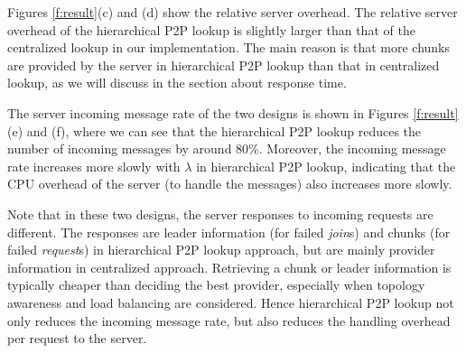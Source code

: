     Figures \ref{f:result}(c) and (d) show the relative server
    overhead.
    The relative server overhead of the hierarchical P2P lookup is
    slightly larger than that of the centralized lookup in our
    implementation. The main reason is that more chunks are provided
    by the server in hierarchical P2P lookup than that in centralized
    lookup, as we will discuss in the section about response time.%

    The server incoming message rate of the two designs is shown in
    Figures \ref{f:result}(e) and (f), where we can see that 
    the hierarchical P2P lookup reduces the number of incoming
    messages by around
    80\%. Moreover, the incoming message rate increases more slowly with
    $\lambda$ in hierarchical P2P lookup, indicating that 
    the CPU overhead of the server (to handle the messages) also 
	increases more slowly.

    Note that in these two designs, the server responses to incoming
    requests are different. The responses are leader
    information (for failed \emph{join}s) and chunks (for failed
    \emph{request}s) in hierarchical P2P lookup approach, but are
    mainly provider information in centralized approach. 
    Retrieving a chunk or leader information is typically
    cheaper than deciding the best provider, especially when
    topology awareness and load balancing are considered. Hence 
    hierarchical P2P lookup not only reduces the incoming message rate, but
    also reduces the handling overhead per request to the server.
    

